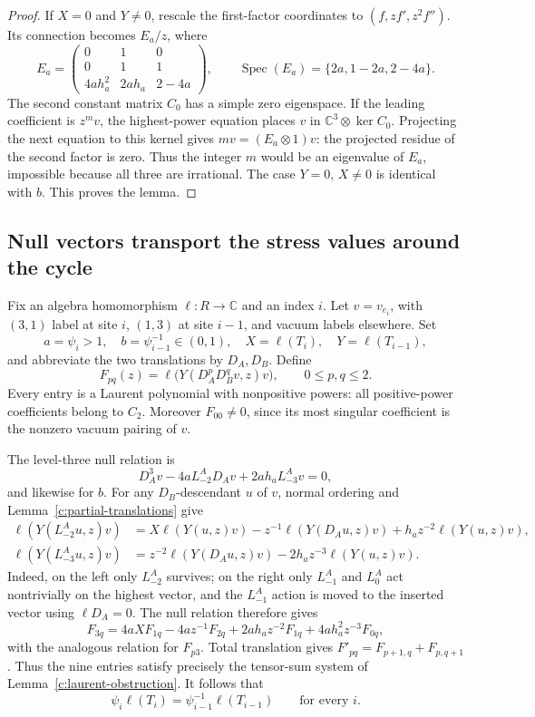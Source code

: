 \documentclass[11pt,a4paper]{article}
\numberwithin{equation}{section}
\theoremstyle{definition}\newtheorem{definition}[theorem]{Definition}
\theoremstyle{remark}\newtheorem{remark}[theorem]{Remark}
\newcommand{\C}{\mathbb C}\newcommand{\Z}{\mathbb Z}\newcommand{\Q}{\mathbb Q}
\begin{document}
\begin{proof}
If $X=0$ and $Y\ne0$, rescale the first-factor coordinates to $(f,zf',z^2f'')$. Its connection becomes $E_a/z$, where
\[
 E_a=\begin{pmatrix}0&1&0\\0&1&1\\4ah_a^2&2ah_a&2-4a\end{pmatrix},\qquad
 \operatorname{Spec}(E_a)=\{2a,1-2a,2-4a\}.
\]
The second constant matrix $C_0$ has a simple zero eigenspace.
If the leading coefficient is $z^m v$, the highest-power equation
places $v$ in $\C^3\otimes\ker C_0$. Projecting the next equation
to this kernel gives $m v=(E_a\otimes1)v$: the projected residue
of the second factor is zero. Thus the integer $m$ would be an
eigenvalue of $E_a$, impossible because all three are irrational. The case $Y=0$, $X\ne0$ is identical with $b$. This proves the lemma.
\end{proof}

\subsection*{Null vectors transport the stress values around the cycle}
Fix an algebra homomorphism $\ell:R\to\C$ and an index $i$. Let $v=v_{e_i}$, with $(3,1)$ label at site $i$, $(1,3)$ at site $i-1$, and vacuum labels elsewhere. Set
\[
 a=\psi_i>1,\quad b=\psi_{i-1}^{-1}\in(0,1),\quad
 X=\ell(T_i),\quad Y=\ell(T_{i-1}),
\]
and abbreviate the two translations by $D_A,D_B$. Define
\[
 F_{pq}(z)=\ell\big(Y(D_A^pD_B^qv,z)v\big),\qquad 0\le p,q\le2.
\]
Every entry is a Laurent polynomial with nonpositive powers: all positive-power coefficients belong to $C_2$. Moreover $F_{00}\ne0$, since its most singular coefficient is the nonzero vacuum pairing of $v$.

The level-three null relation is
\[
 D_A^3v-4aL^A_{-2}D_Av+2ah_aL^A_{-3}v=0,
\]
and likewise for $b$. For any $D_B$-descendant $u$ of $v$, normal ordering and Lemma~\ref{c:partial-translations} give
\begin{align*}
 \ell(Y(L^A_{-2}u,z)v)
 &=X\ell(Y(u,z)v)-z^{-1}\ell(Y(D_Au,z)v)+h_az^{-2}\ell(Y(u,z)v),\\
 \ell(Y(L^A_{-3}u,z)v)
 &=z^{-2}\ell(Y(D_Au,z)v)-2h_az^{-3}\ell(Y(u,z)v).
\end{align*}
Indeed, on the left only $L^A_{-2}$ survives; on the right only $L^A_{-1}$ and $L^A_0$ act nontrivially on the highest vector, and the $L^A_{-1}$ action is moved to the inserted vector using $\ell D_A=0$. The null relation therefore gives
\[
 F_{3q}=4aXF_{1q}-4az^{-1}F_{2q}+2ah_az^{-2}F_{1q}+4ah_a^2z^{-3}F_{0q},
\]
with the analogous relation for $F_{p3}$. Total translation gives $F'_{pq}=F_{p+1,q}+F_{p,q+1}$. Thus the nine entries satisfy precisely the tensor-sum system of Lemma~\ref{c:laurent-obstruction}. It follows that
\begin{equation}\label{c:stress-transport}
 \psi_i\ell(T_i)=\psi_{i-1}^{-1}\ell(T_{i-1})\qquad\text{for every }i.
\end{equation}
\end{document}
